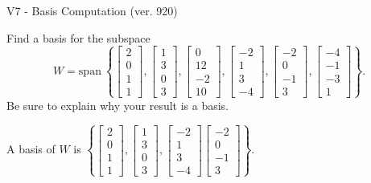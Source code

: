 \begin{exercise}
  \begin{exerciseTitle}V7 - Basis Computation (ver. 920)\end{exerciseTitle}
  \begin{exerciseStatement}
    Find a basis for the subspace 
\[W=\mathrm{span}\ \left\{\left[\begin{array}{r}
2 \\
0 \\
1 \\
1
\end{array}\right] , \left[\begin{array}{r}
1 \\
3 \\
0 \\
3
\end{array}\right] , \left[\begin{array}{r}
0 \\
12 \\
-2 \\
10
\end{array}\right] , \left[\begin{array}{r}
-2 \\
1 \\
3 \\
-4
\end{array}\right] , \left[\begin{array}{r}
-2 \\
0 \\
-1 \\
3
\end{array}\right] , \left[\begin{array}{r}
-4 \\
-1 \\
-3 \\
1
\end{array}\right]\right\}.\]
 Be sure to explain why your result is a basis.


  \end{exerciseStatement}
  \begin{exerciseAnswer}
   A basis of \(W\) is  \(\left\{\left[\begin{array}{r}
2 \\
0 \\
1 \\
1
\end{array}\right] , \left[\begin{array}{r}
1 \\
3 \\
0 \\
3
\end{array}\right] , \left[\begin{array}{r}
-2 \\
1 \\
3 \\
-4
\end{array}\right] \left[\begin{array}{r}
-2 \\
0 \\
-1 \\
3
\end{array}\right]\right\}\).
  


  \end{exerciseAnswer}
\end{exercise}